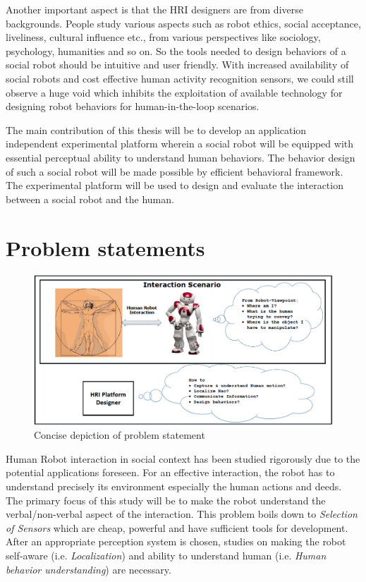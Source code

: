 	Another important aspect is that the HRI designers are from diverse backgrounds. People study various aspects such as robot ethics, social acceptance, liveliness, cultural influence etc., from various perspectives like sociology, psychology, humanities and so on. So the tools needed to design behaviors of a social robot should be intuitive and user friendly.  With increased availability of social robots and cost effective human activity recognition sensors, we could still observe a huge void which inhibits the exploitation of available technology for designing robot behaviors for human-in-the-loop scenarios.
	
	The main contribution of this thesis will be to develop an application independent experimental platform wherein a social robot will be equipped with essential perceptual ability to understand human behaviors. The behavior design of such a social robot will be made possible by efficient behavioral framework. The experimental platform will be used to design and evaluate the interaction between a social robot and the human.	

\section{Problem statements}
\label{sec:problem_statement}
\begin{figure}[H]
\centering
\includegraphics[width=\textwidth]{assets/ProblemStatement.png}
\caption{Concise depiction of problem statement}
\label{fig:problemstatement}
\end{figure}%
	Human Robot interaction in social context has been studied rigorously due to the potential applications foreseen. For an effective interaction, the robot has to understand precisely its environment especially the human actions and deeds. The primary focus of this study will be to make the robot understand the verbal/non-verbal aspect of the interaction. This problem boils down to \emph{Selection of Sensors} which are cheap, powerful and have sufficient tools for development. After an appropriate perception system is chosen, studies on making the robot self-aware (i.e. \emph{Localization}) and ability to understand human (i.e. \emph{Human behavior understanding}) are necessary.
	
